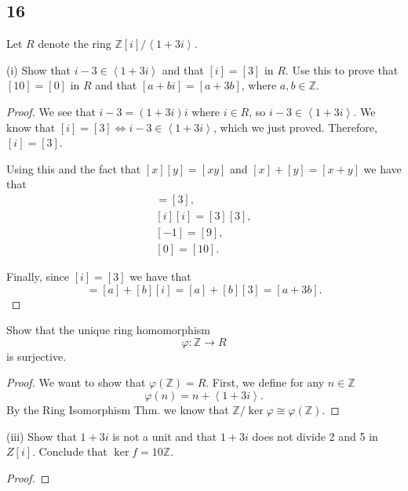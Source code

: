 \documentclass{article}
\newcommand{\Z}{\mathbb{Z}}
\newcommand{\gen}[1]{\left\langle #1 \right\rangle}
\newenvironment{hwproof}[1]
{
    #1
    \begin{proof}
}{
    \end{proof}
}
\begin{document}
\subsection*{16}
\begin{hwproof}
    {
        Let $R$ denote the ring $\Z[i] / \gen{1 + 3i}$.

        (i) Show that $i - 3 \in \gen{1 + 3i}$ and that $[i] = [3]$ in $R$.
        Use this to prove that $[10] = [0]$ in $R$ and that
        $[a + bi] = [a + 3b]$, where $a,b \in \Z$.
    }
    We see that $i - 3 = (1 + 3i)i$ where $i \in R$, so
    $i - 3 \in \gen{1 + 3i}$. We know that $[i] = [3] \iff i - 3 \in \gen{1 + 3i}$,
    which we just proved. Therefore, $[i] = [3]$.

    Using this and the fact that $[x][y]=[xy]$ and $[x] + [y] = [x+y]$ we
    have that
    \begin{gather*}
        [i] = [3],\\
        [i][i] = [3][3], \\
        [-1] = [9],\\
        [0] = [10].
    \end{gather*}

    Finally, since $[i] = [3]$ we have that
    \begin{equation*}
        [a + bi] = [a] + [b][i] = [a] + [b][3] = [a + 3b].
    \end{equation*}

\end{hwproof}

\begin{hwproof}
    {
        Show that the unique ring homomorphism
        \begin{equation*}
            \varphi : \Z \to R
        \end{equation*}
        is surjective.
    }
    We want to show that $\varphi(\Z) = R$. First, we define for any $n \in \Z$
    \begin{equation*}
        \varphi(n) = n + \gen{1 + 3i}.
    \end{equation*}
    By the Ring Isomorphism Thm. we know that $\Z / \ker \varphi \cong \varphi(\Z)$.

\end{hwproof}

\begin{hwproof}
    {
        (iii) Show that $1 + 3i$ is not a unit and that $1 + 3i$ does not divide
        2 and 5 in $Z[i]$. Conclude that $\ker f = 10\Z$.
    }
\end{hwproof}
\end{document}
